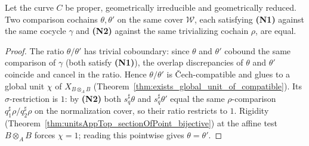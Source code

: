 \begin{theorem}
  \label{thm:normalizedComparison_unique}
  \leanok
  Let the curve \(C\) be proper, geometrically irreducible and geometrically reduced. Two comparison
  cochains \(\theta, \theta'\) on the same cover \(\mathcal W\), each satisfying \textbf{(N1)}
  against the same cocycle \(\gamma\) and \textbf{(N2)} against the same trivializing cochain
  \(\rho\), are equal.
\end{theorem}
\begin{proof}
  \leanok
  The ratio \(\theta/\theta'\) has trivial coboundary: since \(\theta\) and \(\theta'\) cobound the
  same comparison of \(\gamma\) (both satisfy \textbf{(N1)}), the overlap discrepancies of
  \(\theta\) and \(\theta'\) coincide and cancel in the ratio. Hence \(\theta/\theta'\) is \v
  Cech-compatible and glues to a global unit \(\chi\) of \(X_{B \otimes_A B}\)
  (Theorem~\ref{thm:exists_global_unit_of_compatible}). Its \(\sigma\)-restriction is \(1\): by
  \textbf{(N2)} both \(s_q^{\sharp}\theta\) and \(s_q^{\sharp}\theta'\) equal the same
  \(\rho\)-comparison \(q_1^{\sharp}\rho / q_2^{\sharp}\rho\) on the normalization cover, so their
  ratio restricts to \(1\). Rigidity (Theorem~\ref{thm:unitsAppTop_sectionOfPoint_bijective}) at the
  affine test \(B \otimes_A B\) forces \(\chi = 1\); reading this pointwise gives \(\theta =
  \theta'\).
\end{proof}

